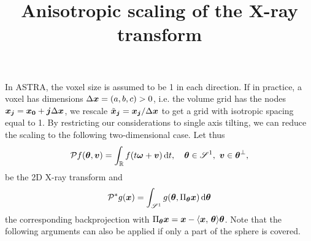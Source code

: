 \documentclass{amsart}
\title{Anisotropic scaling of the X-ray transform}
\begin{document}
\maketitle

In ASTRA, the voxel size is assumed to be 1 in each direction. If in practice, a voxel has dimensions $\Delta {\boldsymbol{x}} = (a, b, c) > 0$, i.e. 
the volume grid has the nodes ${\boldsymbol{x}}_{\boldsymbol{j}} = {\boldsymbol{x}}_{\boldsymbol{0}} + {\boldsymbol{j}} \Delta {\boldsymbol{x}}$, we rescale $\tilde {{\boldsymbol{x}}}_{\boldsymbol{j}} = {\boldsymbol{x}}_{\boldsymbol{j}} / \Delta {\boldsymbol{x}}$ to get a grid 
with isotropic spacing equal to 1. By restricting our considerations to single axis tilting, we can reduce the scaling to the following 
two-dimensional case. Let thus
%
\begin{equation*}
 {\ensuremath{\mathcal{P}}} f({\boldsymbol{\theta}}, {\boldsymbol{v}}) = \int_{\mathbb{R}} f(t{\boldsymbol{\omega}} + {\boldsymbol{v}})\, \mathrm{d} t,\quad {\boldsymbol{\theta}} \in \mathscr{S}^1,\ {\boldsymbol{v}} \in {\boldsymbol{\theta}}^\perp,
\end{equation*}
%
be the 2D X-ray transform and
%
\begin{equation*}
 {\ensuremath{\mathcal{P}}}^* g({\boldsymbol{x}}) = \int_{\mathscr{S}^1} g({\boldsymbol{\theta}}, \Pi_{\boldsymbol{\theta}} {\boldsymbol{x}})\, \mathrm{d} {\boldsymbol{\theta}}
\end{equation*}
%
the corresponding backprojection with $\Pi_{\boldsymbol{\theta}} {\boldsymbol{x}} = {\boldsymbol{x}} - \langle {\boldsymbol{x}},\,{\boldsymbol{\theta}}\rangle{\boldsymbol{\theta}}$. Note that the following arguments can also be 
applied if only a part of the sphere is covered.
\end{document}
